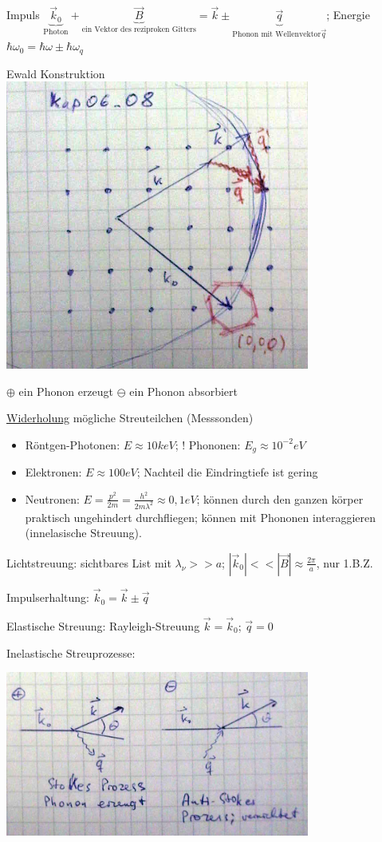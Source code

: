 Impuls \(\underbrace{\vec k_0}_{\text{Photon}} + \underbrace{\vec B}_{\text{ein Vektor des reziproken Gitters}} = \vec k \pm \underbrace{\vec q}_{\text{Phonon mit Wellenvektor}\vec q}\); Energie \(\hbar \omega_0=\hbar\omega \pm \hbar \omega_q\) 

Ewald Konstruktion
\includegraphics[width=0.75\textwidth]{kap06_08.png}

\(\oplus\) ein Phonon erzeugt
\(\ominus\) ein Phonon absorbiert

\underline{Widerholung} mögliche Streuteilchen (Messsonden)

\begin{itemize}
\item Röntgen-Photonen: \(E\approx 10keV\); ! Phononen: \(E_g\approx 10^{-2}eV\)
\item Elektronen: \(E\approx 100eV\); Nachteil die Eindringtiefe ist gering
\item Neutronen: \(E=\frac{p^2}{2m}=\frac{h^2}{2m\lambda^2} \approx 0,1eV\); können durch den ganzen körper praktisch ungehindert durchfliegen; können mit Phononen interaggieren (innelasische Streuung). 
\end{itemize}

Lichtstreuung: sichtbares List mit \(\lambda_\nu >> a\); \(|\vec k_0|<<|\vec B|\approx \frac{2\pi}{a}\), nur 1.B.Z.

Impulserhaltung: \(\vec k_0=\vec k \pm \vec q\)

Elastische Streuung: Rayleigh-Streuung \(\vec k=\vec k_0\); \(\vec q=0\)

Inelastische Streuprozesse:

\includegraphics[width=0.75\textwidth]{kap06_09.png}

